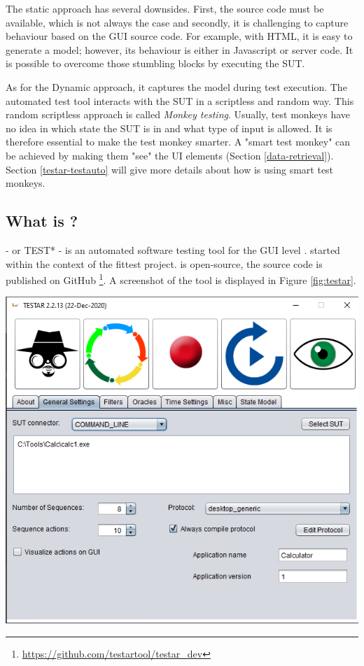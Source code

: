 The static approach has several downsides. First, the source code must be available, which is not always the case and secondly, it is challenging to capture behaviour based on the GUI source code. For example, with HTML, it is easy to generate a model; however, its behaviour is either in Javascript or server code.  It is possible to overcome those stumbling blocks by executing the SUT.
    
As for the Dynamic approach, it captures the model during test execution. The automated test tool interacts with the SUT in a scriptless and random way. This random scriptless approach is called \emph{Monkey testing}. Usually, test monkeys have no idea in which state the SUT is in and what type of input is allowed. It is therefore essential to make the test monkey smarter. A "smart test monkey" can be achieved by making them "see" the UI elements (Section \ref{data-retrieval}). Section \ref{testar-testauto} will give more details about how \testar is using smart test monkeys.

\subsection{What is \testar?} \label{what-is-testar}
\testar - or TEST* - is an automated software testing tool for the GUI level \cite{testar-about}. \testar started within the context of the \acrfull{fittest} project. \testar is open-source, the source code is published on GitHub \footnote{ \url{https://github.com/testartool/testar\_dev}}. A screenshot of the \testar tool is displayed in Figure \ref{fig:testar}.

\bigskip
\begingroup
\captionsetup{type=figure}
\includegraphics[scale=0.5]{images/testar.png}
\label{fig:testar}
\endgroup

